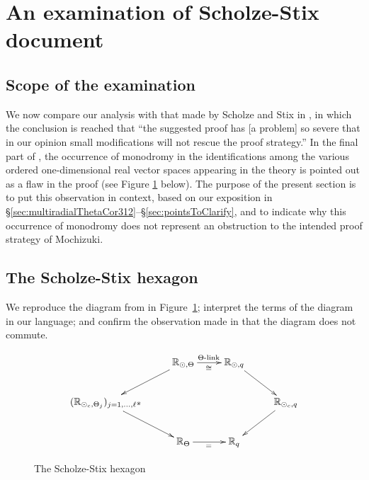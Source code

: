 \documentclass[12pt, reqno, a4paper]{amsart}
\def\bR{\mathbb{R}} %
\begin{document}
\setcounter{equation}{0}
\section{An examination of Scholze-Stix document}\label{sec:ScholzeStixExamination}

\subsection{Scope of the examination}\label{sub:SSScope} %

We now compare our analysis with that made by Scholze and Stix in \cite{Scholze2018WhyA}, in which the conclusion is reached that ``the suggested proof has [a problem] so severe that in
our opinion small modifications will not rescue the proof strategy.'' 
In the final part of \cite{Scholze2018WhyA}, the occurrence of monodromy in the identifications among the various ordered one-dimensional real vector spaces appearing in the theory is pointed out as a flaw in the proof \cite[pp.\ 9--10]{Scholze2018WhyA} (see Figure \ref{fig:TheScholzeStixhexagon} below).
The purpose of the present section is to put this observation in context, based on our exposition 
in \S\ref{sec:multiradialThetaCor312}--\S\ref{sec:pointsToClarify},
and to indicate why this occurrence of monodromy does not represent an obstruction to the intended proof strategy of Mochizuki.


\subsection{The Scholze-Stix hexagon}\label{sub:SSHexagon}

We reproduce the diagram from \cite[p.\ 10]{Scholze2018WhyA} in Figure~\ref{fig:TheScholzeStixhexagon}; interpret the terms of the diagram in our language; and confirm the observation made in \cite{Scholze2018WhyA} that the diagram does not commute.

\begin{figure}[ht]
\begin{center}
$$
\xymatrix{
&\bR_{\odot,\Th}\ar[dl]\ar[r]^{\text{$\Th$-link}}_{\cong}&\bR_{\odot,q}\ar[dr]\\
(\bR_{\odot_c,\Th_j})_{j=1,\ldots,\ell^{\divideontimes}}\ar[dr]&&&\bR_{\odot_c,q}\ar[dl]\\
&\bR_{\Th}\ar[r]_{=}&\bR_{q}
}
$$
\caption{The Scholze-Stix hexagon}
\label{fig:TheScholzeStixhexagon}
\end{center}
\end{figure}
\end{document}
